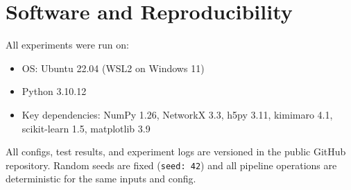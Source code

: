 \section{Software and Reproducibility}

All experiments were run on:
\begin{itemize}
  \item OS: Ubuntu 22.04 (WSL2 on Windows 11)
  \item Python 3.10.12
  \item Key dependencies: NumPy 1.26, NetworkX 3.3, h5py 3.11, kimimaro 4.1,
        scikit-learn 1.5, matplotlib 3.9
\end{itemize}

All configs, test results, and experiment logs are versioned in the public
GitHub repository. Random seeds are fixed (\texttt{seed: 42}) and all
pipeline operations are deterministic for the same inputs and config.
